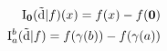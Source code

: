 \documentclass[preview]{standalone}
\begin{document}
\begin{align*}
\special{dvisvgm:raw <g id='unique000'>}\mathrm{I}_{\mathbf{0}}(\tilde{\mathrm{d}}|f)(x) = f(x) - f(\mathbf{0})\\\mathrm{I}_a^b(\tilde{\mathrm{d}}|f) = f(\gamma(b)) - f(\gamma(a))\special{dvisvgm:raw </g>}
\end{align*}
\end{document}

